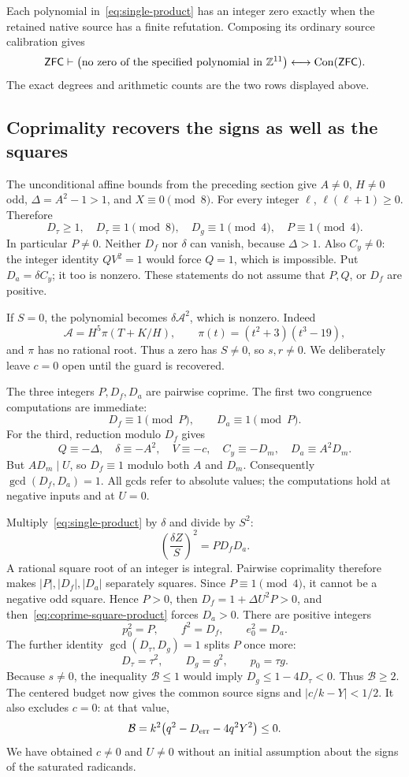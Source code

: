 \begin{theorem}\label{thm:single-product}
Each polynomial in~\eqref{eq:single-product} has an integer zero exactly
when the retained native source has a finite refutation. Composing its
ordinary source calibration gives
\[
 \mathsf{ZFC}\vdash
 \bigl(\text{no zero of the specified polynomial in }\mathbb Z^{11}\bigr)
 \longleftrightarrow\operatorname{Con}(\mathsf{ZFC}).
\]
The exact degrees and arithmetic counts are the two rows displayed above.
\end{theorem}

\subsection{Coprimality recovers the signs as well as the squares}
The unconditional affine bounds from the preceding section give
$A\ne0$, $H\ne0$ odd, $\Delta=A^2-1>1$, and $X\equiv0\pmod8$.
For every integer $\ell$, $\ell(\ell+1)\ge0$. Therefore
\[
 D_\tau\ge1,\quad D_\tau\equiv1\pmod8,\quad
 D_g\equiv1\pmod4,\quad P\equiv1\pmod4.
\]
In particular $P\ne0$. Neither $D_f$ nor $\delta$ can vanish, because
$\Delta>1$. Also $C_y\ne0$: the integer identity $QV^2=1$ would force
$Q=1$, which is impossible. Put $D_a=\delta C_y$; it too is nonzero.
These statements do not assume that $P,Q$, or $D_f$ are positive.

If $S=0$, the polynomial becomes $\delta\mathcal A^2$, which is nonzero.
Indeed
\[
 \mathcal A=H^5\pi(T+K/H),\qquad
 \pi(t)=(t^2+3)(t^3-19),
\]
and $\pi$ has no rational root. Thus a zero has $S\ne0$, so $s,r\ne0$.
We deliberately leave $c=0$ open until the guard is recovered.

The three integers $P,D_f,D_a$ are pairwise coprime. The first two
congruence computations are immediate:
\[
 D_f\equiv1\pmod P,\qquad D_a\equiv1\pmod P.
\]
For the third, reduction modulo $D_f$ gives
\[
 Q\equiv-\Delta,\quad\delta\equiv-A^2,\quad
 V\equiv-c,\quad C_y\equiv-D_m,\quad D_a\equiv A^2D_m.
\]
But $AD_m\mid U$, so $D_f\equiv1$ modulo both $A$ and $D_m$.
Consequently $\gcd(D_f,D_a)=1$. All gcds refer to absolute values;
the computations hold at negative inputs and at $U=0$.

Multiply~\eqref{eq:single-product} by $\delta$ and divide by $S^2$:
\begin{equation}\label{eq:coprime-square-product}
 \left(\frac{\delta Z}{S}\right)^2=P D_fD_a.
\end{equation}
A rational square root of an integer is integral. Pairwise coprimality
therefore makes $|P|,|D_f|,|D_a|$ separately squares. Since
$P\equiv1\pmod4$, it cannot be a negative odd square. Hence $P>0$,
then $D_f=1+\Delta U^2P>0$, and then~\eqref{eq:coprime-square-product}
forces $D_a>0$. There are positive integers
\[
 p_0^2=P,\qquad f^2=D_f,\qquad e_0^2=D_a.
\]
The further identity $\gcd(D_\tau,D_g)=1$ splits $P$ once more:
\[
 D_\tau=\tau^2,\qquad D_g=g^2,\qquad p_0=\tau g.
\]
Because $s\ne0$, the inequality $\mathcal B\le1$ would imply
$D_g\le1-4D_\tau<0$. Thus $\mathcal B\ge2$. The centered budget now
gives the common source signs and $|c/k-Y|<1/2$. It also excludes $c=0$:
at that value,
\[
 \mathcal B=k^2\bigl(q^2-D_{\rm err}-4q^2Y^2\bigr)\le0.
\]
We have obtained $c\ne0$ and $U\ne0$ without an initial assumption about
the signs of the saturated radicands.

